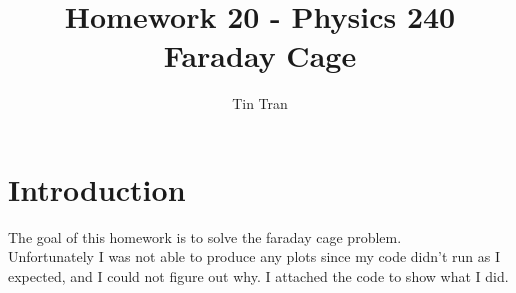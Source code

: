 \documentclass{article}
\begin{document}
\title{Homework 20 - Physics 240\\
		Faraday Cage}
\author{Tin Tran}

\maketitle

\section{Introduction}
The goal of this homework is to solve the faraday cage problem.\\
Unfortunately I was not able to produce any plots since my code didn't run as I expected, and I could not figure out why. I attached the code to show what I did.
\end{document}
